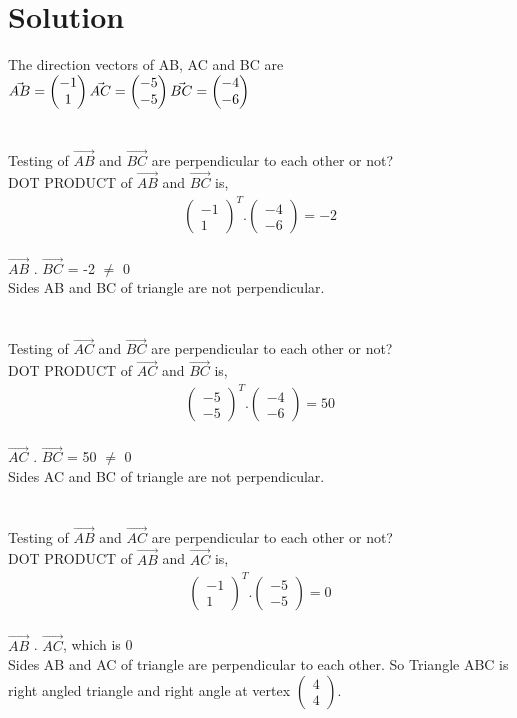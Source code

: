 \documentclass[journal,12pt,twocolumn]{IEEEtran}
\newcommand{\myvec}[1]{\ensuremath{\begin{pmatrix}#1\end{pmatrix}}}
\begin{document}
\section{Solution}
The direction vectors of AB, AC and BC are
$\\
	\vec{AB}=\myvec{-1 \\ 1} \\
	\vec{AC}=\myvec{-5 \\ -5}\\
	\vec{BC}=\myvec{-4 \\ -6} 
$
\\
\\
\\
Testing of  $\vec{AB}$ and $\vec{BC}$ are perpendicular to each other or not?\\
DOT PRODUCT of  $\vec{AB}$ and $\vec{BC}$ is, \begin{align} \myvec{ -1 \\ 1 } ^ {T} . \myvec{ -4 \\ -6 } = -2\end{align}\\
$\vec{AB}$ . $\vec{BC}$ = -2 $\neq$ 0 \\
Sides AB and BC of triangle are not perpendicular.
\\
\\
\\
Testing of  $\vec{AC}$ and $\vec{BC}$ are perpendicular to each other or not?\\
DOT PRODUCT of  $\vec{AC}$ and $\vec{BC}$ is, \begin{align} \myvec{ -5 \\ -5 } ^ {T} . \myvec{ -4 \\ -6 } = 50\end{align}\\
$\vec{AC}$ . $\vec{BC}$ = 50 $\neq$ 0 \\
Sides AC and BC of triangle are not perpendicular.
\\
\\
\\
Testing of  $\vec{AB}$ and $\vec{AC}$ are perpendicular to each other or not?\\
DOT PRODUCT of  $\vec{AB}$ and $\vec{AC}$ is, \begin{align} \myvec{ -1 \\ 1 } ^ {T} . \myvec{ -5 \\ -5 } = 0\end{align}\\
$\vec{AB}$ . $\vec{AC}$, which is 0 \\
Sides AB and AC of triangle are perpendicular to each other. So Triangle ABC is right angled triangle and right angle at vertex \myvec{ 4 \\ 4 }.  
\end{document}
